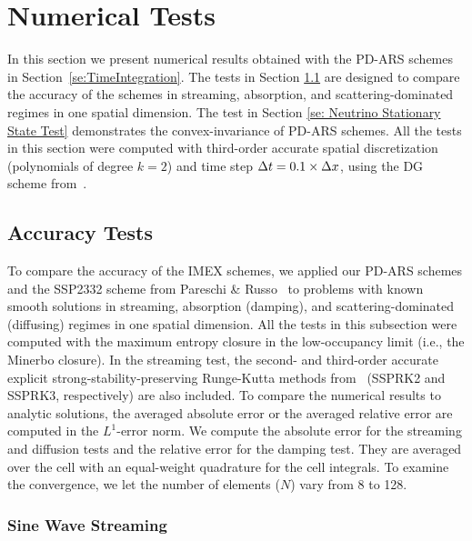 \section{Numerical Tests}\label{se:NumericalTests}

In this section we present numerical results obtained with the PD-ARS schemes in Section~\ref{se:TimeIntegration}.
The tests in Section \ref{se: Accuracy Tests} are designed to compare the accuracy of the schemes in streaming, absorption, and scattering-dominated regimes in one spatial dimension.
The test in Section \ref{se: Neutrino Stationary State Test} demonstrates the convex-invariance of PD-ARS schemes.
All the tests in this section were computed with third-order accurate spatial discretization (polynomials of degree $k=2$) and time step $\Delta t = 0.1 \times \Delta x $, using the DG scheme from~\cite{chu_etal_2018}.

\subsection{Accuracy Tests}
\label{se: Accuracy Tests}

To compare the accuracy of the IMEX schemes, we applied our PD-ARS schemes and the SSP2332 scheme from Pareschi \& Russo~\cite{pareschiRusso_2005} to problems with known smooth solutions in streaming, absorption (damping), and scattering-dominated (diffusing) regimes in one spatial dimension.
All the tests in this subsection were computed with the maximum entropy closure in the low-occupancy limit (i.e., the Minerbo closure).  
In the streaming test, the second- and third-order accurate explicit strong-stability-preserving Runge-Kutta methods from~\cite{gottlieb_etal_2001} (SSPRK2 and SSPRK3, respectively) are also included.  
To compare the numerical results to analytic solutions, the averaged absolute error or the averaged relative error are computed in the $L^{1}$-error norm.
We compute the absolute error for the streaming and diffusion tests and the relative error for the damping test.
They are averaged over the cell with an equal-weight quadrature for the cell integrals.
To examine the convergence, we let the number of elements ($N$) vary from 8 to 128.  

\subsubsection{Sine Wave Streaming}


